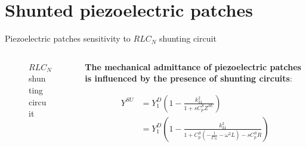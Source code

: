\section[Analysis of shunted piezoelectric patches]{Shunted piezoelectric patches}

\begin{frame}{Piezoelectric patches sensitivity to $RLC_N$ shunting circuit}

    \begin{columns}[c, onlytextwidth]

        \begin{column}{0.3\textwidth}

            \begin{figure}[H]

                \centering


                \caption{$RLC_N$ shunting circuit}

            \end{figure}

        \end{column}

        \hfill

        \begin{column}{0.65\textwidth}

            \textbf{The mechanical admittance of piezoelectric patches is influenced by the presence of shunting circuits}:

            \begin{equation}
                \begin{aligned}
                    Y^{SU} & = Y_1^D \left( 1 - \frac{k_{31}^2}{1 + s C_p^S Z^{SU}} \right)                                               \\
                           & = Y_1^D \left( 1 - \frac{k_{31}^2}{1 + C_p^S \left( -\frac{1}{C_N} - \omega^2 L \right) - s C_p^S R} \right)
                \end{aligned}
                \label{eq:Y_SU_RLC_N}
            \end{equation}


\end{column}
\end{columns}
\end{frame}
